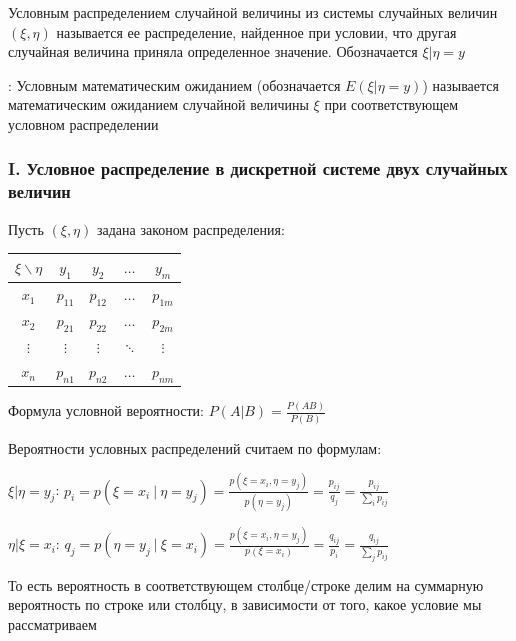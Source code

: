 \documentclass[12pt]{article}
\begin{document}
    \hypertarget{conditionaldistribution}{}

    \Def Условным распределением случайной величины из системы случайных величин $(\xi, \eta)$ 
    называется ее распределение, найденное при условии, что другая случайная величина приняла 
    определенное значение. Обозначается $\xi | \eta = y$

    : Условным математическим ожиданием (обозначается $E(\xi | \eta = y)$) называется 
    математическим ожиданием случайной величины $\xi$ при соответствующем условном распределении

    \subsubsection{I. Условное распределение в дискретной системе двух случайных величин}

    \hypertarget{conditionaldistributionindiscretesystem}{}

    Пусть $(\xi, \eta)$ задана законом распределения:

    \begin{tabular}{c|c|c|c|c}
        $\xi \backslash \eta$ & $y_1$ & $y_2$ & $\dots$ & $y_m$ \\
        \hline
        $x_1$ & $p_{11}$ & $p_{12}$ & $\dots$ & $p_{1m}$ \\
        \hline
        $x_2$ & $p_{21}$ & $p_{22}$ & $\dots$ & $p_{2m}$ \\
        \hline
        $\vdots$ & $\vdots$ & $\vdots$ & $\ddots$ & $\vdots$ \\
        \hline
        $x_n$ & $p_{n1}$ & $p_{n2}$ & $\dots$ & $p_{nm}$ \\
    \end{tabular}

    Формула условной вероятности: $P(A | B) = \frac{P(AB)}{P(B)}$

    Вероятности условных распределений считаем по формулам:

    $\xi | \eta = y_j$: $p_i = p(\xi = x_i \ | \ \eta = y_j) = \frac{p(\xi = x_i, \eta = y_j)}{p(\eta = y_j)} = \frac{p_{ij}}{q_j} = \frac{p_{ij}}{\sum_i p_{ij}}$

    $\eta | \xi = x_i$: $q_j = p(\eta = y_j \ | \ \xi = x_i) = \frac{p(\xi = x_i, \eta = y_j)}{p(\xi = x_i)} = \frac{q_{ij}}{p_i} = \frac{q_{ij}}{\sum_j p_{ij}}$

    То есть вероятность в соответствующем столбце/строке делим на суммарную вероятность по строке или столбцу, в зависимости от того, какое условие мы рассматриваем
\end{document}
